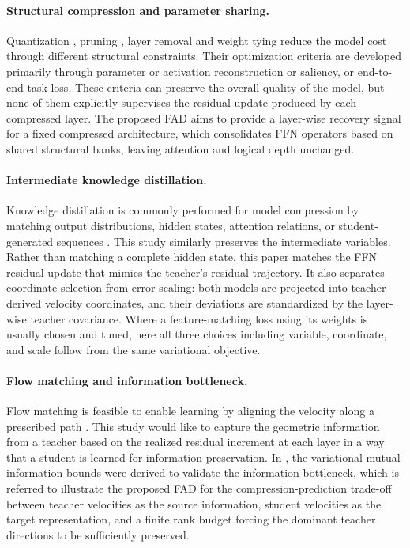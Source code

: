 \documentclass{article}
\theoremstyle{plain}
\theoremstyle{definition}
\theoremstyle{remark}
\begin{document}
\paragraph{Structural compression and parameter sharing.}
Quantization \citep{jacob2018quantization,frantar2023gptq,lin2023awq}, pruning \citep{han2015deepcompression,frantar2023sparsegpt,sun2024wanda,ma2023llmpruner}, layer removal \citep{men2024shortgpt,chen2025streamlining,flatllm,flap} and weight tying \citep{lan2020albert,dehghani2019universal, shareyourattention,flexigpt} reduce the model cost through different structural constraints. Their optimization criteria are developed primarily through parameter or activation reconstruction or saliency, or end-to-end task loss. These criteria can preserve the overall quality of the model, but none of them explicitly supervises the residual update produced by each compressed layer. The proposed FAD aims to provide a layer-wise recovery signal for a fixed compressed architecture, which consolidates {FFN} operators based on shared structural banks, leaving attention and logical depth unchanged.

\paragraph{Intermediate knowledge distillation.}
Knowledge distillation is commonly performed for model compression by matching output distributions, hidden states, attention relations, or student-generated sequences \citep{romero2015fitnets,jiao2020tinybert,wang2020minilm,sanh2019distilbert,
gu2024minillm,agarwal2024gkd}. This study similarly preserves the intermediate variables. Rather than matching a complete hidden state, this paper matches the FFN residual update that mimics the teacher's residual trajectory. It also separates coordinate selection from error scaling: both models are projected into teacher-derived velocity coordinates, and their deviations are standardized by the layer-wise teacher covariance. Where a feature-matching loss using its weights is usually chosen and tuned, here all three choices including variable, coordinate, and scale follow from the same variational objective.

\paragraph{Flow matching and information bottleneck.}
Flow matching is feasible to enable learning by aligning the velocity along a prescribed path \citep{chen2018neuralode,lipman2023flowmatching, liu2023rectified}. This study would like to capture the geometric information from a teacher based on the realized residual increment at each layer in a way that a student is learned for information preservation. In \citep{barber2003im,poole2019variational}, the variational mutual-information bounds were derived to validate the information bottleneck, which is referred to illustrate the proposed FAD for the compression-prediction trade-off between teacher velocities as the source information, student velocities as the target representation, and a finite rank budget forcing the dominant teacher directions to be sufficiently preserved.
\end{document}
